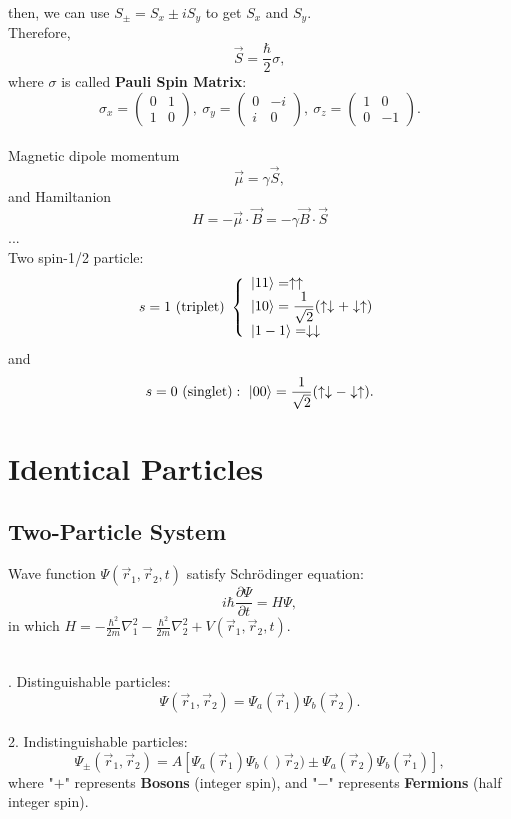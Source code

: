 \documentclass[12pt, 
]{article}
\begin{document}
then, we can use $S_\pm=S_x\pm iS_y$ to get $S_x$ and $S_y$.\\
Therefore, $$\vec{S}=\frac{\hbar}{2}\sigma,$$where $\sigma$ is called {\bf Pauli Spin Matrix}:
\[
	\sigma_x= \begin{pmatrix}
		0&1\\1&0
	\end{pmatrix},~\sigma_y= \begin{pmatrix}
		0&-i\\i&0
	\end{pmatrix},~\sigma_z= \begin{pmatrix}
		1&0\\0&-1
	\end{pmatrix}.
\]
~\\
Magnetic dipole momentum 
\[
	\vec{\mu}=\gamma\vec{S},
\]
and Hamiltanion 
\[
	H=-\vec{\mu}\cdot\vec{B}=-\gamma\vec{B}\cdot\vec{S}
\]
...\\
Two spin-1/2 particle:
\[
	s=1~({\rm triplet})~\left\{
	\begin{array}{l}
		\ket{11}=\uparrow\uparrow\\
		\ket{10}=\dfrac{1}{\sqrt{2}}(\uparrow\downarrow+\downarrow\uparrow)\\
		\ket{1-1}=\downarrow\downarrow
	\end{array}\right.
\]
and
\[
	s=0~(\rm singlet):~\ket{00}=\frac{1}{\sqrt{2}}(\uparrow\downarrow-\downarrow\uparrow).
\]
\newpage
\section{Identical Particles}
\subsection{Two-Particle System}
Wave function $\varPsi(\vec{r}_1,\vec{r}_2,t)$ satisfy Schr\"odinger equation:
\[
	i\hbar\frac{\partial\varPsi}{\partial t}=H\varPsi,
\]
in which $\displaystyle H=-\frac{\hbar^2}{2m}\nabla^2_1-\frac{\hbar^2}{2m}\nabla_2^2+V(\vec{r}_1,\vec{r}_2,t).$\\~

. Distinguishable particles:
\[
	\varPsi(\vec{r}_1,\vec{r}_2)=\varPsi_a(\vec{r}_1)\varPsi_b(\vec{r}_2).
\]\\
2. Indistinguishable particles:
\[
	\varPsi_\pm(\vec{r}_1,\vec{r}_2)=A[\varPsi_a(\vec{r}_1)\varPsi_b()\vec{r}_2)\pm\varPsi_a(\vec{r}_2)\varPsi_b(\vec{r}_1)],
\]
where "$+$" represents {\bf Bosons} (integer spin), and "$-$" represents {\bf Fermions} (half integer spin).\\
\end{document}
